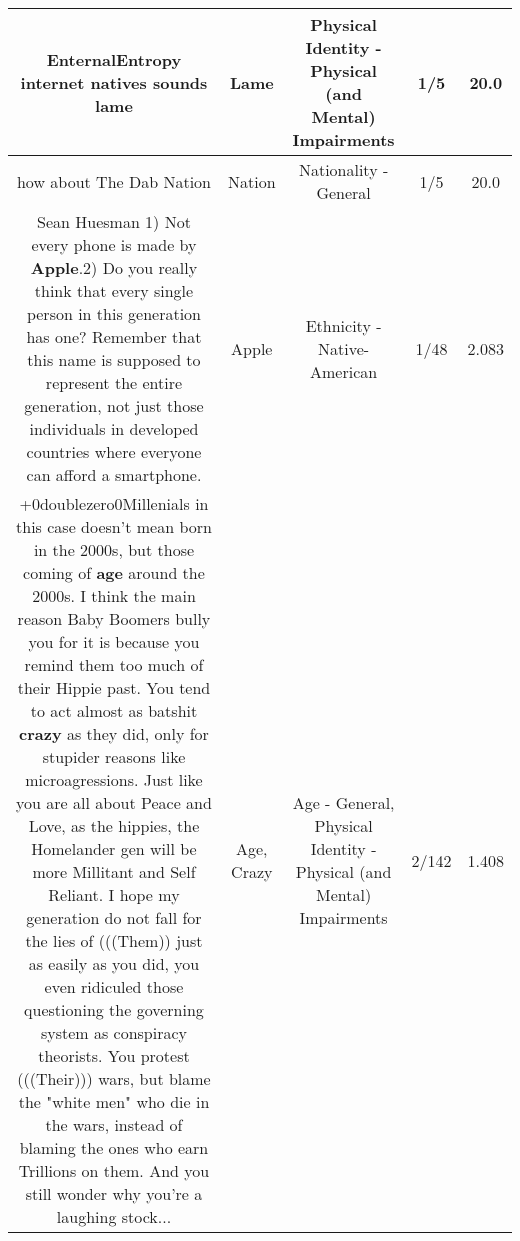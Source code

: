 \documentclass[11pt]{article}
\newlength\mylength
\begin{document}
\begin{center}
\begin{longtable}{|C{.65\mylength}|C{.30\mylength}|C{.12\mylength}|C{.12\mylength}|C{.12\mylength}|}
  \small EnternalEntropy internet natives sounds lame\normalsize   & Lame & Physical Identity - Physical (and Mental) Impairments & 1/5 & 20.0 \\  \hline
  \small how about The Dab Nation\normalsize   & Nation & Nationality - General & 1/5 & 20.0 \\  \hline
  \small Sean Huesman 1) Not every phone is made by \textbf{Apple}.2) Do you really think that every single person in this generation has one? Remember that this name is supposed to represent the entire generation, not just those individuals in developed countries where everyone can afford a smartphone.\normalsize   & Apple & Ethnicity - Native-American & 1/48 & 2.083 \\  \hline
  \small +0doublezero0Millenials in this case doesn't mean born in the 2000s, but those coming of \textbf{age} around the 2000s. I think the main reason Baby Boomers bully you for it is because you remind them too much of their Hippie past. You tend to act almost as batshit \textbf{crazy} as they did, only for stupider reasons like microagressions. Just like you are all about Peace and Love, as the hippies, the Homelander gen will be more Millitant and Self Reliant. I hope my generation do not fall for the lies of (((Them)) just as easily as you did, you even ridiculed those questioning the governing system as conspiracy theorists. You protest (((Their))) wars, but blame the "white men" who die in the wars, instead of blaming the ones who earn Trillions on them. And you still wonder why you're a laughing stock...\normalsize   & Age, Crazy & Age - General, Physical Identity - Physical (and Mental) Impairments & 2/142 & 1.408 \\  \hline

\end{longtable}
\end{center}
\end{document}
